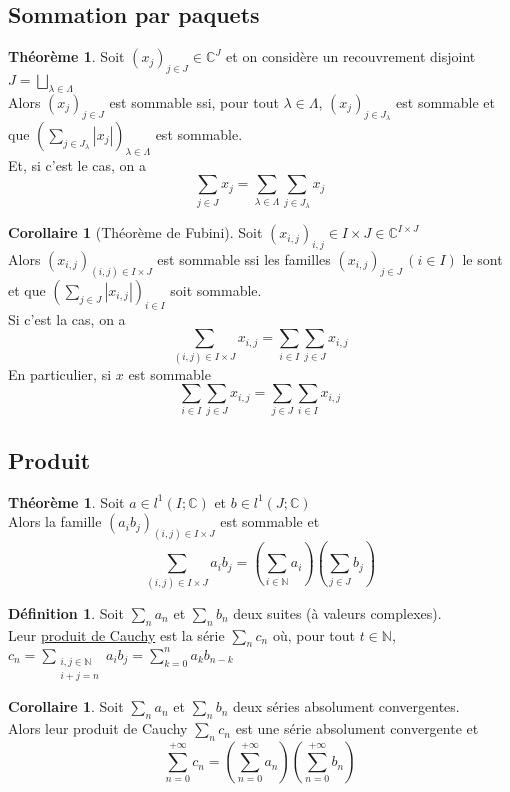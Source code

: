 \documentclass[10pt,a4paper]{article}
\theoremstyle{definition}
\newtheorem{theorem}[proposition]{Théorème}
\newtheorem{corollaire}[proposition]{Corollaire}
\newtheorem{definition}[proposition]{Définition}
\begin{document}
\subsection{Sommation par paquets}
\begin{theorem}
Soit $(x_j)_{j \in J} \in \mathbb{C}^J$ et on considère un recouvrement disjoint $J = \bigsqcup\limits_{\lambda \in \Lambda}$ \\
Alors $(x_j)_{j \in J}$ est sommable ssi, pour tout $\lambda \in \Lambda$, $(x_j)_{j \in J_\lambda}$ est sommable et que $(\sum\limits_{j \in J_\lambda} \left| x_j \right|)_{\lambda \in \Lambda}$ est sommable. \\
Et, si c'est le cas, on a
\[ \sum_{j \in J} x_j = \sum_{\lambda \in \Lambda} \sum_{j \in J_\lambda} x_j\]
\end{theorem}
\begin{corollaire}[Théorème de Fubini]
Soit $(x_{i, j})_{i, j} \in I \times J \in \mathbb{C}^{I \times J}$ \\
Alors $(x_{i, j})_{(i, j) \in I \times J}$ est sommable ssi les familles $(x_{i, j})_{j \in J} \, (i \in I)$ le sont et que $(\sum\limits_{j \in J} \left| x_{i, j} \right|)_{i \in I}$ soit sommable. \\
Si c'est la cas, on a
\[\sum_{(i, j) \in I \times J} x_{i, j} = \sum_{i \in I} \sum_{j \in J} x_{i, j}\]
En particulier, si $x$ est sommable
\[ \sum_{i \in I} \sum_{j \in J} x_{i, j} = \sum_{j \in J} \sum_{i \in I} x_{i, j}\]
\end{corollaire}

\subsection{Produit}
\begin{theorem}
Soit $a \in l^1(I; \mathbb{C})$ et $b \in l^1(J; \mathbb{C})$ \\
Alors la famille $(a_i b_j)_{(i, j) \in I \times J}$ est sommable et
\[\sum_{(i, j) \in I \times J} a_i b_j = \left(\sum_{i \in \mathbb{N}} a_i \right) \left(\sum_{j \in J} b_j\right)\]
\end{theorem}
\begin{definition}
Soit $\sum\limits_n a_n$ et $\sum\limits_n b_n$ deux suites (à valeurs complexes). \\
Leur \uline{produit de Cauchy} est la série $\sum\limits_n c_n$ où, pour tout $t \in \mathbb{N}$, $c_n = \sum\limits_{\substack{i, j \in \mathbb{N} \\ i + j = n}} a_i b_j = \sum\limits_{k = 0}^n a_k b_{n - k}$
\end{definition}
\begin{corollaire}
Soit $\sum\limits_n a_n$ et $\sum\limits_n b_n$ deux séries absolument convergentes. \\
Alors leur produit de Cauchy $\sum\limits_n c_n$ est une série absolument convergente et
\[\sum_{n = 0}^{+\infty} c_n = \left( \sum_{n = 0}^{+\infty} a_n \right) \left( \sum_{n = 0}^{+\infty} b_n \right)\]
\end{corollaire}
\end{document}
